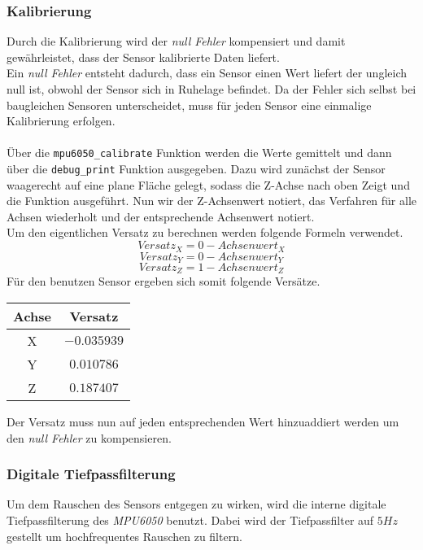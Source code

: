     \subsubsection{Kalibrierung}
      Durch die Kalibrierung wird der \textit{null Fehler} kompensiert und damit 
      gewährleistet, dass der Sensor kalibrierte Daten liefert.
      \\
      Ein \textit{null Fehler} entsteht dadurch, dass ein Sensor einen Wert
      liefert der ungleich null ist, obwohl der Sensor sich in Ruhelage
      befindet. Da der Fehler sich selbst bei  baugleichen Sensoren
      unterscheidet, muss für jeden Sensor eine einmalige Kalibrierung erfolgen.
      \\\\
      Über die \texttt{mpu6050\_calibrate} Funktion werden die Werte gemittelt
      und dann über die \texttt{debug\_print} Funktion ausgegeben.
      Dazu wird zunächst der Sensor waagerecht auf eine plane Fläche gelegt,
      sodass die Z-Achse nach oben Zeigt und die Funktion ausgeführt.
      Nun wir der Z-Achsenwert notiert, das Verfahren für alle Achsen
      wiederholt und der entsprechende Achsenwert notiert.
      \\
      Um den eigentlichen Versatz zu berechnen werden folgende Formeln verwendet.
      $$  Versatz_X = 0 - Achsenwert_X $$
      $$  Versatz_Y = 0 - Achsenwert_Y $$
      $$  Versatz_Z = 1 - Achsenwert_Z $$
      Für den benutzen Sensor ergeben sich somit folgende Versätze.
      \begin{center}
        \begin{tabular}{| c | c |}
            \hline
            Achse & Versatz \\
            \hline
            X & $-0.035939$ \\
            \hline
            Y & $0.010786$ \\
            \hline
            Z & $0.187407$ \\
            \hline
        \end{tabular}
      \end{center}
      Der Versatz muss nun auf jeden entsprechenden Wert hinzuaddiert werden um
      den \textit{null Fehler} zu kompensieren.
      


    \subsubsection{Digitale Tiefpassfilterung}
      Um dem Rauschen des Sensors entgegen zu wirken, wird die interne digitale
      Tiefpassfilterung des \textit{MPU6050} benutzt. Dabei wird der Tiefpassfilter
      auf $5Hz$ gestellt um hochfrequentes Rauschen zu filtern.

 



      